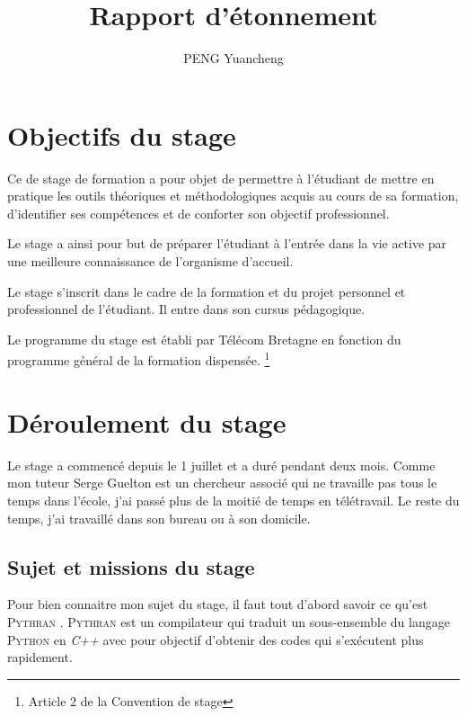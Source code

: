 \documentclass[a4paper, 11pt]{article}
\newcommand\Pythran{\textsc{Pythran}}
\newcommand\Python{\textsc{Python}}
\begin{document}
\title{Rapport d'étonnement}
\author{PENG Yuancheng}
\maketitle

\hypersetup{linkcolor=black}
\tableofcontents
\setcounter{tocdepth}{3}


\section{Objectifs du stage}

Ce de stage de formation a pour objet de permettre à l'étudiant de mettre en
pratique les outils théoriques et méthodologiques acquis au cours de sa
formation, d'identifier ses compétences et de conforter son objectif
professionnel.

Le stage a ainsi pour but de préparer l'étudiant à l'entrée dans la vie active
par une meilleure connaissance de l'organisme d'accueil.

Le stage s'inscrit dans le cadre de la formation et du projet personnel et
professionnel de l'étudiant. Il entre dans son cursus pédagogique.

Le programme du stage est établi par Télécom Bretagne en fonction du programme
général de la formation dispensée. \footnote{Article 2 de la Convention de stage}

\section{Déroulement du stage}
\label{sec:deroulement-stage}

Le stage a commencé depuis le 1 juillet et a duré pendant deux mois.
Comme mon tuteur Serge Guelton est un chercheur associé qui ne travaille
pas tous le temps dans l'école, j'ai passé plus de la moitié de temps en
télétravail. Le reste du temps, j'ai travaillé dans son bureau ou à son domicile.

\subsection*{Sujet et missions du stage}

Pour bien connaitre mon sujet du stage, il faut tout d'abord savoir ce qu'est
\Pythran{} \cite{pythran}. \Pythran{} est un compilateur qui traduit un sous-ensemble du
langage \Python{} en \emph{C++} avec pour objectif d'obtenir des codes qui
s'exécutent plus rapidement.
\end{document}
